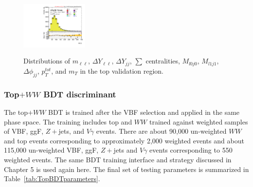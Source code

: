 \begin{figure}[!h]
{      \includegraphics[width=0.3\textwidth]{Pictures/run2-emme-CutVBFTopControl_2jetinclZttVeto-Ml1j1-lin.pdf}
  }\hfill
  \hfill
  \hfill
{\caption{Distributions of $m_{\ell\ell}$, $\Delta Y_{\ell\ell}$, $\Delta Y_{jj}$, $\sum$ centralities, $M_{l0j0}$, $M_{l1j1}$, $\Delta\phi_{jj}$, $p_T^{tot}$, and $m_T$ in the top validation region.
\label{fig:TopCR3}}}
\end{figure}

\subsubsection{Top$+WW$ BDT discriminant}

The top$+WW$ BDT is trained after the VBF selection and applied in the same phase space. The training includes top and $WW$ trained against weighted samples of VBF, ggF, $Z+$jets, and $V\gamma$ events. There are about 90,000 un-weighted $WW$ and top events corresponding to approximately 2,000 weighted events and about 115,000 un-weighted VBF, ggF, $Z+$jets and $V\gamma$ events corresponding to 550 weighted events. The same BDT training interface and strategy discussed in Chapter 5 is used again here. The final set of testing parameters is summarized in Table~\ref{tab:TopBDTparameters}.

